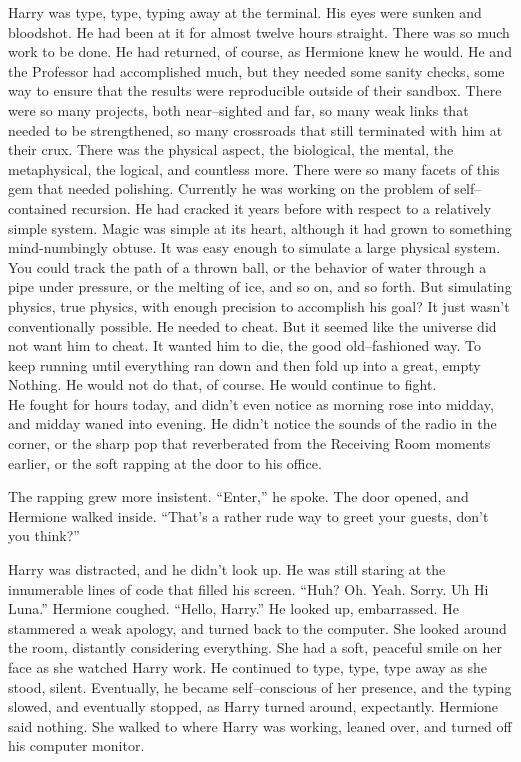 Harry was type, type, typing away at the terminal. His eyes were sunken and bloodshot. He had been at it for almost twelve hours straight. There was so much work to be done. He had returned, of course, as Hermione knew he would. He and the Professor had accomplished much, but they needed some sanity checks, some way to ensure that the results were reproducible outside of their sandbox.
\SmallVSpace
There were so many projects, both near\mbox{--}sighted and far, so many weak links that needed to be strengthened, so many crossroads that still terminated with him at their crux. There was the physical aspect, the biological, the mental, the metaphysical, the logical, and countless more. There were so many facets of this gem that needed polishing.
\SmallVSpace
Currently he was working on the problem of self\mbox{--}contained recursion. He had cracked it years before with respect to a relatively simple system. Magic was simple at its heart, although it had grown to something mind-numbingly obtuse. It was easy enough to simulate a large physical system. You could track the path of a thrown ball, or the behavior of water through a pipe under pressure, or the melting of ice, and so on, and so forth. But simulating physics, true physics, with enough precision to accomplish his goal? It just wasn’t conventionally possible. He needed to cheat.
\SmallVSpace
But it seemed like the universe did not want him to cheat. It wanted him to die, the good old\mbox{--}fashioned way. To keep running until everything ran down and then fold up into a great, empty Nothing.
\SmallVSpace
He would not do that, of course. He would continue to fight.\\
He fought for hours today, and didn’t even notice as morning rose into midday, and midday waned into evening. He didn’t notice the sounds of the radio in the corner, or the sharp pop that reverberated from the Receiving Room moments earlier, or the soft rapping at the door to his office.


The rapping grew more insistent. “Enter,” he spoke.
\SmallVSpace
The door opened, and Hermione walked inside. “That’s a rather rude way to greet your guests, don’t you think?”

Harry was distracted, and he didn’t look up. He was still staring at the innumerable lines of code that filled his screen. “Huh? Oh. Yeah. Sorry. Uh{\el} Hi Luna.”
\SmallVSpace
Hermione coughed. “Hello, Harry.”
\SmallVSpace
He looked up, embarrassed. He stammered a weak apology, and turned back to the computer. She looked around the room, distantly considering everything. She had a soft, peaceful smile on her face as she watched Harry work. He continued to type, type, type away as she stood, silent. Eventually, he became self\mbox{--}conscious of her presence, and the typing slowed, and eventually stopped, as Harry turned around, expectantly.
\SmallVSpace
Hermione said nothing. She walked to where Harry was working, leaned over, and turned off his computer monitor.

